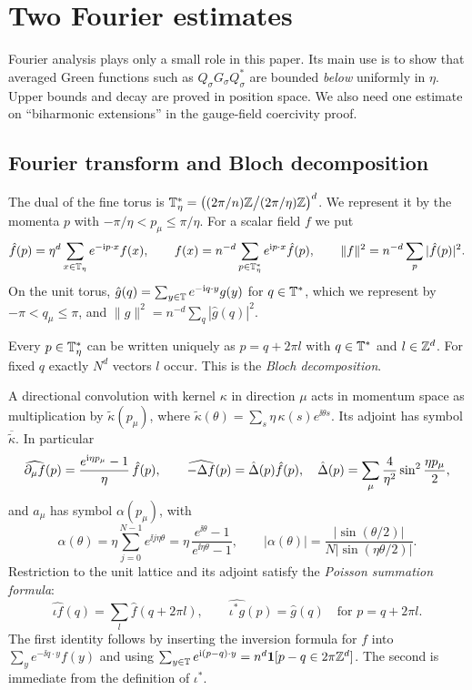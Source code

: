 \section{Two Fourier estimates}\label{sec:fourier}

Fourier analysis plays only a small role in this paper. Its main use is to show that averaged Green functions such as $Q_\sigma G_\sigma Q_\sigma^*$ are bounded \emph{below} uniformly in $\eta$. Upper bounds and decay are proved in position space. We also need one estimate on ``biharmonic extensions'' in the gauge-field coercivity proof.

\subsection{Fourier transform and Bloch decomposition}

The dual of the fine torus is $\mathbb T_\eta^*=\big((2\pi/n)\mathbb Z\big/(2\pi/\eta)\mathbb Z\big)^d$. We represent it by the momenta $p$ with $-\pi/\eta<p_\mu\le\pi/\eta$. For a scalar field $f$ we put
\[
\hat f(p)=\eta^d\sum_{x\in\mathbb T_\eta}e^{-\mathrm i p\cdot x}f(x),\qquad f(x)=n^{-d}\sum_{p\in\mathbb T_\eta^*}e^{\mathrm i p\cdot x}\hat f(p),\qquad \|f\|^2=n^{-d}\sum_p|\hat f(p)|^2 .
\]
On the unit torus, $\hat g(q)=\sum_{y\in\mathbb T}e^{-\mathrm i q\cdot y}g(y)$ for $q\in\mathbb T^*$, which we represent by $-\pi<q_\mu\le\pi$, and $\|g\|^2=n^{-d}\sum_q|\hat g(q)|^2$.

Every $p\in\mathbb T_\eta^*$ can be written uniquely as $p=q+2\pi l$ with $q\in\mathbb T^*$ and $l\in\mathbb Z^d$. For fixed $q$ exactly $N^d$ vectors $l$ occur. This is the \emph{Bloch decomposition}.

A directional convolution with kernel $\kappa$ in direction $\mu$ acts in momentum space as multiplication by $\tilde\kappa(p_\mu)$, where $\tilde\kappa(\theta)=\sum_s\eta\,\kappa(s)e^{\ii\theta s}$. Its adjoint has symbol $\overline{\tilde\kappa}$. In particular
\[
\widehat{\partial_\mu f}(p)=\frac{e^{\mathrm i\eta p_\mu}-1}\eta\,\hat f(p),\qquad
\widehat{-\Delta f}(p)=\hat{\Delta}(p)\hat f(p),\quad \hat{\Delta}(p)=\sum_\mu\frac4{\eta^2}\sin^2\frac{\eta p_\mu}2,
\]
and $a_\mu$ has symbol $\alpha(p_\mu)$, with
\[
\alpha(\theta)=\eta\sum_{j=0}^{N-1}e^{\ii j\eta\theta}=\eta\,\frac{e^{\ii\theta}-1}{e^{\ii\eta\theta}-1},\qquad |\alpha(\theta)|=\frac{|\sin(\theta/2)|}{N|\sin(\eta\theta/2)|}.
\]
Restriction to the unit lattice and its adjoint satisfy the \emph{Poisson summation formula}:
\begin{equation}\label{eq:poisson}
\widehat{\iota f}(q)=\sum_{l}\hat f(q+2\pi l),\qquad \widehat{\iota^*g}(p)=\hat g(q)\quad\text{for }p=q+2\pi l .
\end{equation}
The first identity follows by inserting the inversion formula for $f$ into $\sum_ye^{-\ii q\cdot y}f(y)$ and using $\sum_{y\in\mathbb T}e^{\mathrm i(p-q)\cdot y}=n^d\mathbf 1[p-q\in2\pi\mathbb Z^d]$. The second is immediate from the definition of $\iota^*$.

